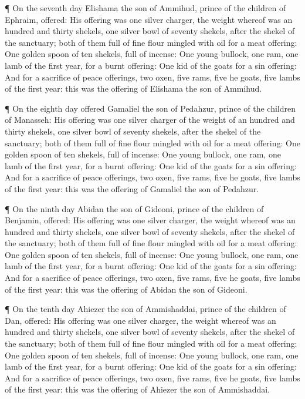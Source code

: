  ¶ On the seventh day Elishama the son of Ammihud, prince
of the children of Ephraim, offered:  His offering was one
silver charger, the weight whereof was an hundred and thirty shekels,
one silver bowl of seventy shekels, after the shekel of the sanctuary;
both of them full of fine flour mingled with oil for a meat offering:
 One golden spoon of ten shekels, full of incense:
 One young bullock, one ram, one lamb of the first year,
for a burnt offering:  One kid of the goats for a sin
offering:  And for a sacrifice of peace offerings, two
oxen, five rams, five he goats, five lambs of the first year: this was
the offering of Elishama the son of Ammihud.

 ¶ On the eighth day offered Gamaliel the son of Pedahzur,
prince of the children of Manasseh:  His offering was one
silver charger of the weight of an hundred and thirty shekels, one
silver bowl of seventy shekels, after the shekel of the sanctuary; both
of them full of fine flour mingled with oil for a meat offering:
 One golden spoon of ten shekels, full of incense:
 One young bullock, one ram, one lamb of the first year,
for a burnt offering:  One kid of the goats for a sin
offering:  And for a sacrifice of peace offerings, two
oxen, five rams, five he goats, five lambs of the first year: this was
the offering of Gamaliel the son of Pedahzur.

 ¶ On the ninth day Abidan the son of Gideoni, prince of
the children of Benjamin, offered:  His offering was one
silver charger, the weight whereof was an hundred and thirty shekels,
one silver bowl of seventy shekels, after the shekel of the sanctuary;
both of them full of fine flour mingled with oil for a meat offering:
 One golden spoon of ten shekels, full of incense:
 One young bullock, one ram, one lamb of the first year,
for a burnt offering:  One kid of the goats for a sin
offering:  And for a sacrifice of peace offerings, two
oxen, five rams, five he goats, five lambs of the first year: this was
the offering of Abidan the son of Gideoni.

 ¶ On the tenth day Ahiezer the son of Ammishaddai, prince
of the children of Dan, offered:  His offering was one
silver charger, the weight whereof was an hundred and thirty shekels,
one silver bowl of seventy shekels, after the shekel of the sanctuary;
both of them full of fine flour mingled with oil for a meat offering:
 One golden spoon of ten shekels, full of incense:
 One young bullock, one ram, one lamb of the first year,
for a burnt offering:  One kid of the goats for a sin
offering:  And for a sacrifice of peace offerings, two
oxen, five rams, five he goats, five lambs of the first year: this was
the offering of Ahiezer the son of Ammishaddai.

